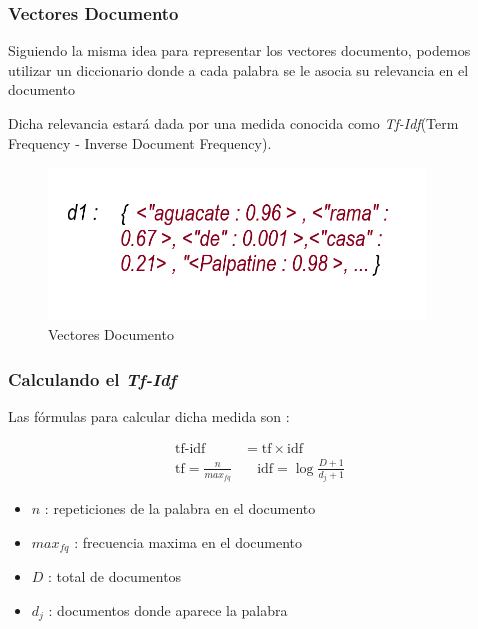 \documentclass{beamer}
\begin{document}
\begin{frame}
    \frametitle{Vectores Documento}
    Siguiendo la misma idea para representar los vectores documento, podemos utilizar un diccionario donde a cada palabra
    se le asocia su relevancia en el documento

    Dicha relevancia estará dada por una medida conocida como \textit{Tf-Idf}(Term Frequency - Inverse Document Frequency).
\end{frame}

\begin{frame}
    \begin{figure}
        \includegraphics[width = 10cm]{./../images/tfidf.png}
        \caption{Vectores Documento}
    \end{figure}
        
\end{frame}

\begin{frame}
    \frametitle{Calculando el \textit{Tf-Idf}}
    Las fórmulas para calcular dicha medida son : 

    \begin{align*}
        \text{tf-idf} &= \text{tf} \times \text{idf} \\
        \text{tf} = \frac{n}{max_{fq}} &\quad \text{idf} = \log\frac{D + 1}{d_j + 1}
    \end{align*}

    \begin{itemize}
        \item $n$ : repeticiones de la palabra en el documento
        \item $max_{fq}$ : frecuencia maxima en el documento
        \item $D$ : total de documentos
        \item $d_j$ : documentos donde aparece la palabra
    \end{itemize}
    

\end{frame}
\end{document}
